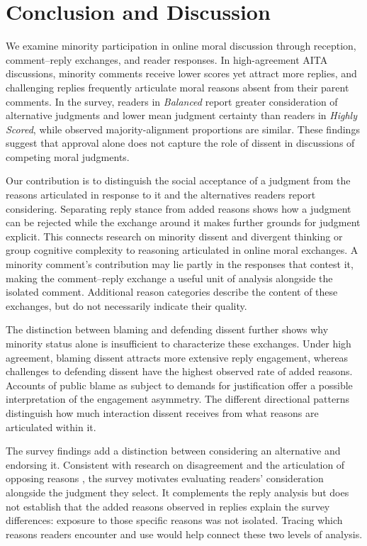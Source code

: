 \section{Conclusion and Discussion}
\label{sec:conclusion}

We examine minority participation in online moral discussion through
reception, comment--reply exchanges, and reader responses. In
high-agreement AITA discussions, minority comments receive lower scores yet
attract more replies, and challenging replies frequently articulate moral
reasons absent from their parent comments. In the survey, readers in
\emph{Balanced} report greater consideration of alternative judgments and
lower mean judgment certainty than readers in \emph{Highly Scored}, while
observed majority-alignment proportions are similar. These findings
suggest that approval alone does not capture the role of dissent in
discussions of competing moral judgments.

Our contribution is to distinguish the social acceptance of a judgment
from the reasons articulated in response to it and the alternatives
readers report considering. Separating reply stance from added reasons
shows how a judgment can be rejected while the exchange around it makes
further grounds for judgment explicit. This connects research on
minority dissent and divergent thinking or group cognitive complexity
\cite{nemeth1986differential,curseu2012socially} to reasoning articulated in online moral exchanges. A minority comment's contribution may lie
partly in the responses that contest it, making the comment--reply
exchange a useful unit of analysis alongside the isolated comment.
Additional reason categories describe the content of these exchanges, but do not necessarily indicate their quality.

The distinction between blaming and defending dissent further shows why
minority status alone is insufficient to characterize these exchanges.
Under high agreement, blaming dissent attracts more extensive reply
engagement, whereas challenges to defending dissent have the highest
observed rate of added reasons. Accounts of public blame as subject to
demands for justification \cite{malle2022socially} offer a possible
interpretation of the engagement asymmetry. The different directional
patterns distinguish how much interaction dissent receives from what
reasons are articulated within it.

The survey findings add a distinction between considering an alternative
and endorsing it. Consistent with research on disagreement and the
articulation of opposing reasons \cite{price2002disagreement}, the survey
motivates evaluating readers' consideration alongside the judgment they
select. It complements the reply analysis but does not establish that
the added reasons observed in replies explain the survey differences:
exposure to those specific reasons was not isolated. Tracing which
reasons readers encounter and use would help connect these two levels of
analysis.

